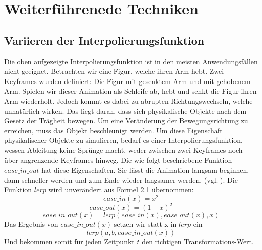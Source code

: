 \chapter{Weiterführenede Techniken}
\label{cha:weitere_techniken}
%
%
\section{Variieren der Interpolierungsfunktion}
\label{sec:var_der_interpolierungsfunktion}
%
Die oben aufgezeigte Interpolierungsfunktion ist in den meisten Anwendungsfällen nicht geeignet. Betrachten wir eine Figur, welche ihren Arm hebt. Zwei Keyframes wurden definiert: Die Figur mit gesenktem Arm und mit gehobenem Arm. Spielen wir dieser Animation als Schleife ab, hebt und senkt die Figur ihren Arm wiederholt. Jedoch kommt es dabei zu abrupten Richtungswechseln, welche unnatürlich wirken. Das liegt daran, dass sich physikalische Objekte nach dem Gesetz der Trägheit bewegen. Um eine Veränderung der Bewegungsrichtung zu erreichen, muss das Objekt beschleunigt werden.\newline\newline
Um diese Eigenschaft physikalischer Objekte zu simulieren, bedarf es einer Interpolierungsfunktion, wessen Ableitung keine Sprünge macht, weder zwischen zwei Keyframes noch über angrenzende Keyframes hinweg. \newline\newline
%
Die wie folgt beschriebene Funktion $ease\_in\_out$ hat diese Eigenschaften. Sie lässt die Animation langsam beginnen, dann schneller werden und zum Ende wieder langsamer werden. (vgl. \cite{Febucci2018}). Die Funktion $lerp$ wird unverändert aus Formel 2.1 übernommen:
%
\begin{equation}
	ease\_in(x) = x^2
\end{equation}
\begin{equation}
	ease\_out(x) = (1-x)^2
\end{equation}
\begin{equation}
	ease\_in\_out(x) = lerp(ease\_in(x), ease\_out(x), x)
\end{equation}
\newline
Das Ergebnis von $ease\_in\_out(x)$ setzen wir statt x in $lerp$ ein
%
\begin{equation}
	lerp(a,b,ease\_in\_out(x))
\end{equation}
%
Und bekommen somit für jeden Zeitpunkt $t$ den richtigen Transformations-Wert.
%
